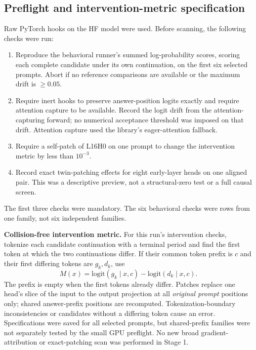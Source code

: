 \documentclass[11pt,a4paper]{article}
\begin{document}
\subsection{Preflight and intervention-metric specification}
Raw PyTorch hooks on the HF model were used. Before scanning, the following checks were run:
\begin{enumerate}[itemsep=1pt]
\item Reproduce the behavioral runner's summed log-probability scores, scoring each complete candidate under its own continuation, on the first six selected prompts. Abort if no reference comparisons are available or the maximum drift is $\ge 0.05$.
\item Require inert hooks to preserve answer-position logits exactly and require attention capture to be available. Record the logit drift from the attention-capturing forward; no numerical acceptance threshold was imposed on that drift. Attention capture used the library's eager-attention fallback.
\item Require a self-patch of L16H0 on one prompt to change the intervention metric by less than $10^{-3}$.
\item Record exact twin-patching effects for eight early-layer heads on one aligned pair. This was a descriptive preview, not a structural-zero test or a full causal screen.
\end{enumerate}
The first three checks were mandatory. The six behavioral checks were rows from one family, not six independent families.

\textbf{Collision-free intervention metric.} For this run's intervention checks, tokenize each candidate continuation with a terminal period and find the first token at which the two continuations differ. If their common token prefix is $c$ and their first differing tokens are $g_k,d_k$, use
\begin{equation}
M(x)=\mathrm{logit}(g_k\mid x,c)-\mathrm{logit}(d_k\mid x,c).
\end{equation}
The prefix is empty when the first tokens already differ. Patches replace one head's slice of the input to the output projection at all \emph{original prompt} positions only; shared answer-prefix positions are recomputed. Tokenization-boundary inconsistencies or candidates without a differing token cause an error. Specifications were saved for all selected prompts, but shared-prefix families were not separately tested by the small GPU preflight. No new broad gradient-attribution or exact-patching scan was performed in Stage 1.
\end{document}
